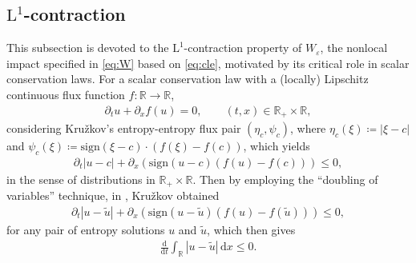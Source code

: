 \documentclass[10pt]{amsart}
\theoremstyle{plain}
\theoremstyle{definition}
\numberwithin{equation}{section}
\newcommand{\R}{\mathbb{R}}
\newcommand{\eps}{{\varepsilon}}
\newcommand{\sgn}[1]{\mathrm{sign}\left(#1\right)}
\begin{document}
\subsection{\texorpdfstring{$\mathrm{L}^1$}{L-1}-contraction}
\label{ssec:L1-contr}
This subsection is devoted to the $\mathrm{L}^1$-contraction property of $W_\eps$, the nonlocal impact specified in \cref{eq:W} based on \cref{eq:cle}, motivated by its critical role in scalar conservation laws. For a scalar conservation law with a (locally) Lipschitz continuous flux function $f:\R \to \R$,
\begin{align*}
    \partial_t u +\partial_xf(u)=0,  \qquad (t,x) \in \R_+\times \R,
\end{align*}
considering Kru\v{z}kov's entropy-entropy flux pair $(\eta_c,\psi_c)$, where $\eta_c(\xi)\coloneqq|\xi-c|$ and $\psi_c(\xi)\coloneqq\sgn{\xi-c}\cdot(f(\xi)-f(c))$, which yields 
\begin{align*}
    \partial_t |u-c| + \partial_x \left( \sgn{u-c}(f(u)-f(c)) \right) \leq0,
\end{align*}
in the sense of distributions in $\R_+\times \R$.
Then by employing the ``doubling of variables''  technique, in \cite{zbMATH03341462}, Kru\v{z}kov obtained 
\begin{align*}
    \partial_t |u-\tilde{u}| + \partial_x \left( \sgn{u-\tilde{u}}(f(u)-f(\tilde{u})) \right) \leq0,
\end{align*}
for any pair of entropy solutions $u$ and $\tilde{u}$, which then gives
\begin{align*}
    \frac{\mathrm d}{\mathrm dt}\int_\mathbb{R} |u-\tilde{u}|\,\mathrm dx \leq 0.
\end{align*}
\end{document}
